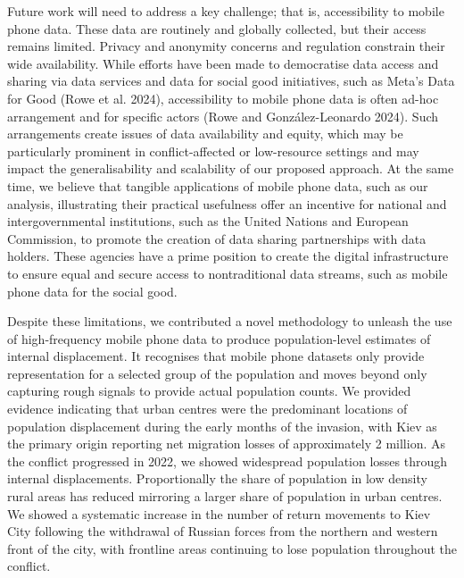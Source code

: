 \documentclass[
  sn-nature,
  11pt,
]{sn-jnl}
\begin{document}
Future work will need to address a key challenge; that is, accessibility
to mobile phone data. These data are routinely and globally collected,
but their access remains limited. Privacy and anonymity concerns and
regulation constrain their wide availability. While efforts have been
made to democratise data access and sharing via data services and data
for social good initiatives, such as Meta's Data for Good (Rowe et al.
2024), accessibility to mobile phone data is often ad-hoc arrangement
and for specific actors (Rowe and González-Leonardo 2024). Such
arrangements create issues of data availability and equity, which may be
particularly prominent in conflict-affected or low-resource settings and
may impact the generalisability and scalability of our proposed
approach. At the same time, we believe that tangible applications of
mobile phone data, such as our analysis, illustrating their practical
usefulness offer an incentive for national and intergovernmental
institutions, such as the United Nations and European Commission, to
promote the creation of data sharing partnerships with data holders.
These agencies have a prime position to create the digital
infrastructure to ensure equal and secure access to nontraditional data
streams, such as mobile phone data for the social good.

Despite these limitations, we contributed a novel methodology to unleash
the use of high-frequency mobile phone data to produce population-level
estimates of internal displacement. It recognises that mobile phone
datasets only provide representation for a selected group of the
population and moves beyond only capturing rough signals to provide
actual population counts. We provided evidence indicating that urban
centres were the predominant locations of population displacement during
the early months of the invasion, with Kiev as the primary origin
reporting net migration losses of approximately 2 million. As the
conflict progressed in 2022, we showed widespread population losses
through internal displacements. Proportionally the share of population
in low density rural areas has reduced mirroring a larger share of
population in urban centres. We showed a systematic increase in the
number of return movements to Kiev City following the withdrawal of
Russian forces from the northern and western front of the city, with
frontline areas continuing to lose population throughout the conflict.
\end{document}
